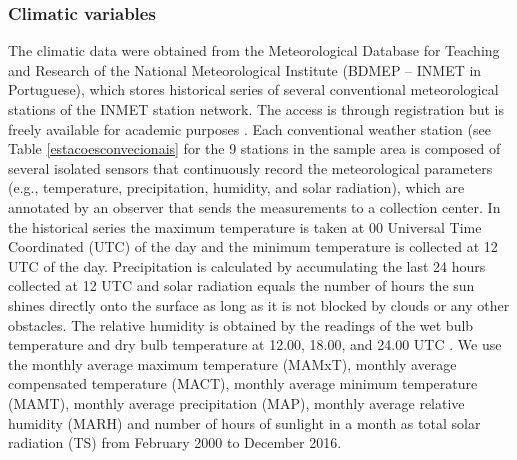 \subsubsection{Climatic variables} %


The climatic data were obtained from the Meteorological Database for Teaching and Research of the National Meteorological Institute (BDMEP – INMET in Portuguese), which stores historical series of several conventional meteorological stations of the INMET station network. The access is through registration but is freely available for academic purposes \citep{bdmep_2018}. Each conventional weather station (see Table \ref{estacoesconvecionais} for the 9 stations in the sample area is composed of several isolated sensors that continuously record the meteorological parameters (e.g., temperature, precipitation, humidity, and solar radiation), which are annotated by an observer that sends the measurements to a collection center. In the historical series the maximum temperature is taken at 00 Universal Time Coordinated (UTC) of the day and the minimum temperature is collected at 12 UTC of the day. Precipitation is calculated by accumulating the last 24 hours collected at 12 UTC and solar radiation equals the number of hours the sun shines directly onto the surface as long as it is not blocked by clouds or any other obstacles. The relative humidity is obtained by the readings of the wet bulb temperature and dry bulb temperature at 12.00, 18.00, and 24.00 UTC \citep{vianello_2011}. We use the monthly average maximum temperature (MAMxT), monthly average compensated temperature (MACT), monthly average minimum temperature (MAMT), monthly average precipitation (MAP), monthly average relative humidity (MARH) and number of hours of sunlight in a month as total solar radiation (TS) from February 2000 to December 2016. 

